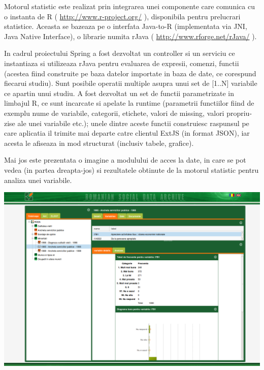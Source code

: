 Motorul statistic este realizat prin integrarea unei componente care comunica cu o instanta de R 
( \url{http://www.r-project.org/} ), 
disponibila pentru prelucrari statistice.
Aceasta se bazeaza pe o interfata Java-to-R 
(implementata via JNI, Java Native Interface), 
o librarie numita rJava ( \url{http://www.rforge.net/rJava/} ).

In cadrul proiectului Spring a fost dezvoltat un controller si un serviciu ce instantiaza si utilizeaza rJava 
pentru evaluarea de expresii, comenzi, functii 
(acestea fiind construite pe baza datelor importate in baza de date, ce corespund fiecarui studiu). 
Sunt posibile operatii multiple asupra unui set de [1..N] variabile ce apartin unui studiu.
A fost dezvoltat un set de functii parametrizate in limbajul R, ce sunt incarcate si apelate la runtime 
(parametrii functiilor fiind de exemplu nume de variabile, categorii, etichete, valori de missing, valori propriu-zise ale unei variabile etc.);
unele dintre aceste functii construiesc raspunsul pe care aplicatia il trimite mai departe catre clientul ExtJS (in format JSON), 
iar acesta le afiseaza in mod structurat (inclusiv tabele, grafice).

Mai jos este prezentata o imagine a modulului de acces la date, in care se pot vedea (in partea dreapta-jos) 
si rezultatele obtinute de la motorul statistic pentru analiza unei variabile.

\medskip
\includegraphics[width=\textwidth]{img/Screenshot-statistics}
